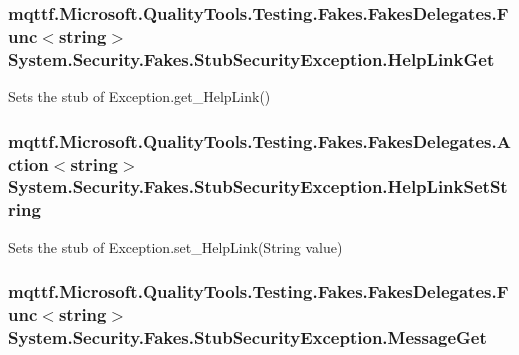 \hypertarget{class_system_1_1_security_1_1_fakes_1_1_stub_security_exception_a6e783c9b7d645215f7e3f061de2c5bc9}{
\subsubsection[{Help\-Link\-Get}]{\setlength{\rightskip}{0pt plus 5cm}mqttf.\-Microsoft.\-Quality\-Tools.\-Testing.\-Fakes.\-Fakes\-Delegates.\-Func$<$string$>$ System.\-Security.\-Fakes.\-Stub\-Security\-Exception.\-Help\-Link\-Get}}\label{class_system_1_1_security_1_1_fakes_1_1_stub_security_exception_a6e783c9b7d645215f7e3f061de2c5bc9}


Sets the stub of Exception.\-get\-\_\-\-Help\-Link()

\hypertarget{class_system_1_1_security_1_1_fakes_1_1_stub_security_exception_a24169793414704cc84979053557907cb}{
\subsubsection[{Help\-Link\-Set\-String}]{\setlength{\rightskip}{0pt plus 5cm}mqttf.\-Microsoft.\-Quality\-Tools.\-Testing.\-Fakes.\-Fakes\-Delegates.\-Action$<$string$>$ System.\-Security.\-Fakes.\-Stub\-Security\-Exception.\-Help\-Link\-Set\-String}}\label{class_system_1_1_security_1_1_fakes_1_1_stub_security_exception_a24169793414704cc84979053557907cb}


Sets the stub of Exception.\-set\-\_\-\-Help\-Link(\-String value)

\hypertarget{class_system_1_1_security_1_1_fakes_1_1_stub_security_exception_ab35bf73d6c6b51260edaa3e8e3391b3a}{
\subsubsection[{Message\-Get}]{\setlength{\rightskip}{0pt plus 5cm}mqttf.\-Microsoft.\-Quality\-Tools.\-Testing.\-Fakes.\-Fakes\-Delegates.\-Func$<$string$>$ System.\-Security.\-Fakes.\-Stub\-Security\-Exception.\-Message\-Get}}\label{class_system_1_1_security_1_1_fakes_1_1_stub_security_exception_ab35bf73d6c6b51260edaa3e8e3391b3a}


